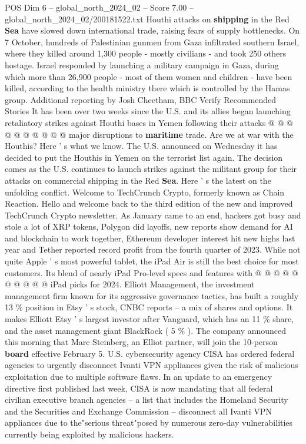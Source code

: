 \begin{textsample}{POS Dim 6 – global\_north\_2024\_02 – Score 7.00 – global\_north\_2024\_02/200181522.txt}
Houthi attacks on \textbf{shipping} in the Red \textbf{Sea} have slowed down international trade, raising fears of supply bottlenecks.
On 7 October, hundreds of Palestinian gunmen from Gaza infiltrated southern Israel, where they killed around 1,300 people - mostly civilians - and took 250 others hostage.
Israel responded by launching a military campaign in Gaza, during which more than 26,900 people - most of them women and children - have been killed, according to the health ministry there which is controlled by the Hamas group.
Additional reporting by Josh Cheetham, BBC Verify Recommended Stories It has been over two weeks since the U.S. and its allies began launching retaliatory strikes against Houthi bases in Yemen following their attacks @ @ @ @ @ @ @ @ @ @ major disruptions to \textbf{maritime} trade.
Are we at war with the Houthis?
Here ' s what we know.
The U.S. announced on Wednesday it has decided to put the Houthis in Yemen on the terrorist list again.
The decision comes as the U.S. continues to launch strikes against the militant group for their attacks on commercial shipping in the Red \textbf{Sea}.
Here ' s the latest on the unfolding conflict.
Welcome to TechCrunch Crypto, formerly known as Chain Reaction.
Hello and welcome back to the third edition of the new and improved TechCrunch Crypto newsletter.
As January came to an end, hackers got busy and stole a lot of XRP tokens, Polygon did layoffs, new reports show demand for AI and blockchain to work together, Ethereum developer interest hit new highs last year and Tether reported record profit from the fourth quarter of 2023.
While not quite Apple ' s most powerful tablet, the iPad Air is still the best choice for most customers.
Its blend of nearly iPad Pro-level specs and features with @ @ @ @ @ @ @ @ @ @ iPad picks for 2024.
Elliott Management, the investment management firm known for its aggressive governance tactics, has built a roughly 13 \% position in Etsy ' s stock, CNBC reports -- a mix of shares and options.
It makes Elliott Etsy ' s largest investor after Vanguard, which has an 11 \% share, and the asset management giant BlackRock ( 5 \% ).
The company announced this morning that Marc Steinberg, an Elliot partner, will join the 10-person \textbf{board} effective February 5.
U.S. cybersecurity agency CISA has ordered federal agencies to urgently disconnect Ivanti VPN appliances given the risk of malicious exploitation due to multiple software flaws.
In an update to an emergency directive first published last week, CISA is now mandating that all federal civilian executive branch agencies -- a list that includes the Homeland Security and the Securities and Exchange Commission -- disconnect all Ivanti VPN appliances due to the"serious threat"posed by numerous zero-day vulnerabilities currently being exploited by malicious hackers.

\end{textsample}
